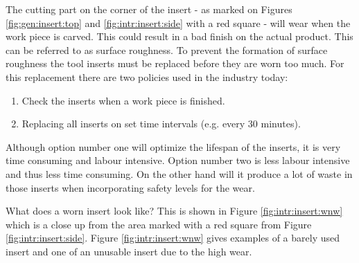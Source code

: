 The cutting part on the corner of the insert - as marked on Figures \ref{fig:gen:insert:top} and \ref{fig:intr:insert:side} with a red square - will wear when the work piece is carved. This could result in a bad finish on the actual product. This can be referred to as surface roughness. To prevent the formation of surface roughness the tool inserts must be replaced before they are worn too much. For this replacement there are two policies used in the industry today:
    \begin{enumerate}
        \item Check the inserts when a work piece is finished.
        \item Replacing all inserts on set time intervals (e.g. every 30 minutes).
    \end{enumerate}
     Although option number one will optimize the lifespan of the inserts, it is very time consuming and labour intensive. Option number two is less labour intensive and thus less time consuming. On the other hand will it produce a lot of waste in those inserts when incorporating safety levels for the wear. 


What does a worn insert look like? This is shown in Figure \ref{fig:intr:insert:wnw} which is a close up from the area marked with a red square from Figure \ref{fig:intr:insert:side}.
Figure \ref{fig:intr:insert:wnw} gives examples of a barely used insert and one of an unusable insert due to the high wear.

